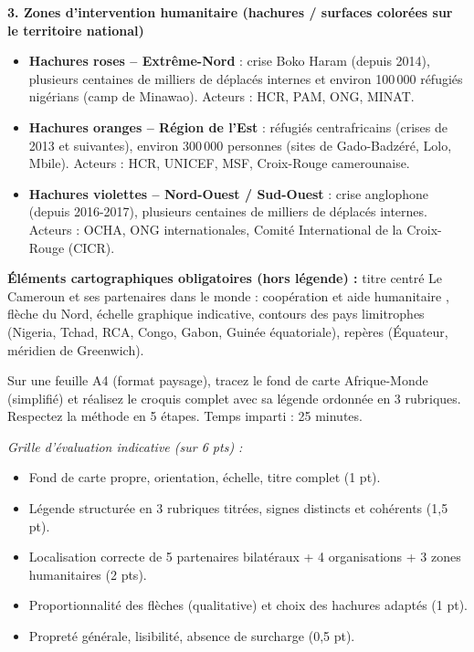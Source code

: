 \documentclass[11pt]{article}
\begin{document}
\begin{exoresolu}
\textbf{3. Zones d'intervention humanitaire (hachures / surfaces colorées sur le territoire national)}
\begin{itemize}
    \item \textbf{Hachures roses -- Extrême-Nord} : crise Boko Haram (depuis 2014), plusieurs centaines de milliers de déplacés internes et environ 100\,000 réfugiés nigérians (camp de Minawao). Acteurs : HCR, PAM, ONG, MINAT.
    \item \textbf{Hachures oranges -- Région de l'Est} : réfugiés centrafricains (crises de 2013 et suivantes), environ 300\,000 personnes (sites de Gado-Badzéré, Lolo, Mbile). Acteurs : HCR, UNICEF, MSF, Croix-Rouge camerounaise.
    \item \textbf{Hachures violettes -- Nord-Ouest / Sud-Ouest} : crise anglophone (depuis 2016-2017), plusieurs centaines de milliers de déplacés internes. Acteurs : OCHA, ONG internationales, Comité International de la Croix-Rouge (CICR).
\end{itemize}

\textbf{Éléments cartographiques obligatoires (hors légende) :} titre centré \og Le Cameroun et ses partenaires dans le monde : coopération et aide humanitaire \fg, flèche du Nord, échelle graphique indicative, contours des pays limitrophes (Nigeria, Tchad, RCA, Congo, Gabon, Guinée équatoriale), repères (Équateur, méridien de Greenwich).
\end{exoresolu}

\begin{exercice}
Sur une feuille A4 (format paysage), tracez le fond de carte Afrique-Monde (simplifié) et réalisez le croquis complet avec sa légende ordonnée en 3 rubriques. Respectez la méthode en 5 étapes. Temps imparti : 25 minutes.
\end{exercice}

\begin{corrige}[Exercice TP 1]
\emph{Grille d'évaluation indicative (sur 6 pts) :}
\begin{itemize}
    \item Fond de carte propre, orientation, échelle, titre complet (1 pt).
    \item Légende structurée en 3 rubriques titrées, signes distincts et cohérents (1,5 pt).
    \item Localisation correcte de 5 partenaires bilatéraux + 4 organisations + 3 zones humanitaires (2 pts).
    \item Proportionnalité des flèches (qualitative) et choix des hachures adaptés (1 pt).
    \item Propreté générale, lisibilité, absence de surcharge (0,5 pt).
\end{itemize}
\end{corrige}
\end{document}
